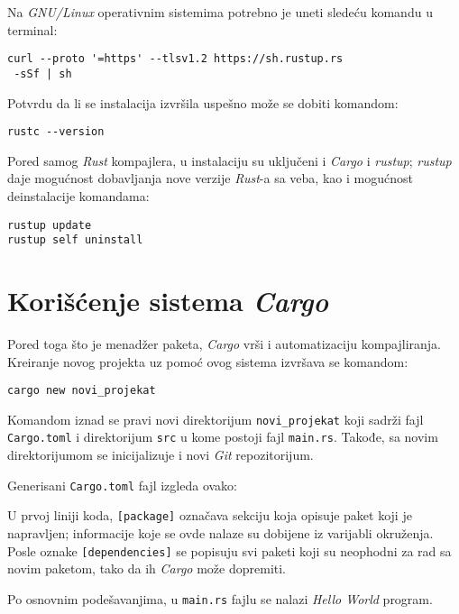 \documentclass[12pt,oneside]{memoir}
\begin{document}
Na \emph{GNU/Linux} operativnim sistemima potrebno je uneti sledeću 
komandu u terminal:

\begin{verbatim}
curl --proto '=https' --tlsv1.2 https://sh.rustup.rs 
 -sSf | sh
\end{verbatim}

Potvrdu da li se instalacija izvršila uspešno može se dobiti 
komandom:

\begin{verbatim}
rustc --version
\end{verbatim}

Pored samog \emph{Rust} kompajlera, u instalaciju su uključeni i 
\emph{Cargo} i \emph{rustup}; \emph{rustup} daje mogućnost 
dobavljanja nove verzije \emph{Rust}-a sa veba, kao i 
mogućnost deinstalacije komandama:

\begin{verbatim}
rustup update
rustup self uninstall
\end{verbatim}

\section{Korišćenje sistema \emph{Cargo}}
Pored toga što je menadžer paketa, \emph{Cargo} vrši i automatizaciju 
kompajliranja. Kreiranje novog projekta uz pomoć ovog sistema izvršava 
se komandom:

\begin{verbatim}
cargo new novi_projekat
\end{verbatim}

Komandom iznad se pravi novi direktorijum \texttt{novi\_projekat} koji 
sadrži fajl \texttt{Cargo.toml} i direktorijum \texttt{src} u kome 
postoji fajl \texttt{main.rs}. Takođe, sa novim direktorijumom se 
inicijalizuje i novi \emph{Git} repozitorijum.

Generisani \texttt{Cargo.toml} fajl izgleda ovako:



U prvoj liniji koda, \texttt{[package]} označava sekciju koja opisuje 
paket koji je napravljen; informacije koje se ovde nalaze su dobijene 
iz varijabli okruženja. Posle oznake \texttt{[dependencies]} se 
popisuju svi paketi koji su neophodni za rad sa novim paketom, 
tako da ih \emph{Cargo} može dopremiti.

Po osnovnim podešavanjima, u \texttt{main.rs} fajlu se nalazi 
\emph{Hello World} program.
\end{document}
